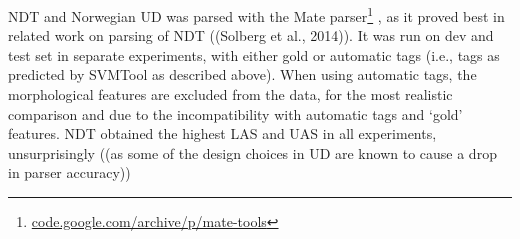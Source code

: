 \documentclass[10pt, a4paper]{article}
\begin{document}
NDT and Norwegian UD was parsed with the Mate
parser\footnote{\url{code.google.com/archive/p/mate-tools}} \cite{Boh:10}, as
it proved best in related work on parsing of NDT ((Solberg et al., 2014)). It
was run on dev and test set in separate experiments, with either gold or
automatic tags (i.e., tags as predicted by SVMTool as described above).  When
using automatic tags, the morphological features are excluded from the data,
for the most realistic comparison and due to the incompatibility with automatic
tags and `gold' features. NDT obtained the highest LAS and UAS in all
experiments, unsurprisingly ((as some of the design choices in UD are known to
cause a drop in parser accuracy))

\end{document}
